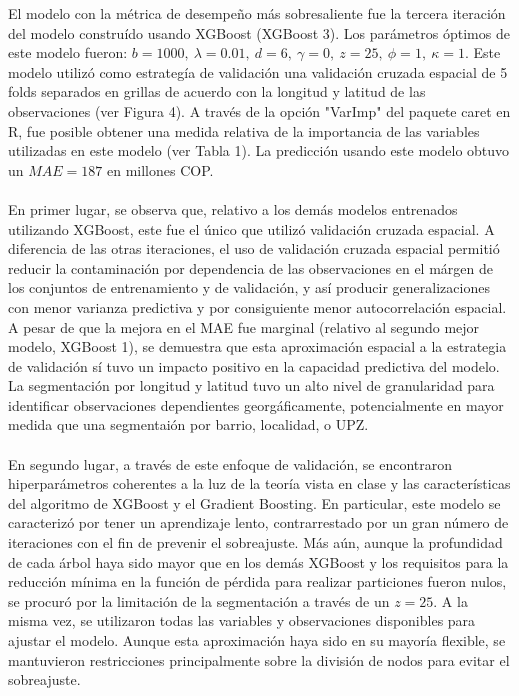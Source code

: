 \documentclass[article,11 pt]{article}
\begin{document}
El modelo con la métrica de desempeño más sobresaliente fue la tercera iteración del modelo construído usando XGBoost (XGBoost 3). Los parámetros óptimos de este modelo fueron: $b = 1000,\ \lambda = 0{.}01,\ d = 6,\ \gamma = 0,\ z = 25,\ \phi = 1,\ \kappa = 1$. Este modelo utilizó como estrategía de validación una validación cruzada espacial de 5 folds separados en grillas de acuerdo con la longitud y latitud de las observaciones (ver Figura 4). A través de la opción "VarImp" del paquete caret en R, fue posible obtener una medida relativa de la importancia de las variables utilizadas en este modelo (ver Tabla 1). La predicción usando este modelo obtuvo un  $MAE= 187 $ en millones COP.
\\
\\
En primer lugar, se observa que, relativo a los demás modelos entrenados utilizando XGBoost, este fue el único que utilizó validación cruzada espacial. A diferencia de las otras iteraciones, el uso de validación cruzada espacial permitió reducir la contaminación por dependencia de las observaciones en el márgen de los conjuntos de entrenamiento y de validación, y así producir generalizaciones con menor varianza predictiva y por consiguiente menor autocorrelación espacial. A pesar de que la mejora en el MAE fue marginal (relativo al segundo mejor modelo, XGBoost 1), se demuestra que esta aproximación espacial a la estrategia de validación sí tuvo un impacto positivo en la capacidad predictiva del modelo. La segmentación por longitud y latitud tuvo un alto nivel de granularidad para identificar observaciones dependientes georgáficamente, potencialmente en mayor medida que una segmentaión por barrio, localidad, o UPZ.
\\
\\
En segundo lugar, a través de este enfoque de validación, se encontraron hiperparámetros coherentes a la luz de la teoría vista en clase y las características del algoritmo de XGBoost y el Gradient Boosting. En particular, este modelo se caracterizó por tener un aprendizaje lento, contrarrestado por un gran número de iteraciones con el fin de prevenir el sobreajuste. Más aún, aunque la profundidad de cada árbol haya sido mayor que en los demás XGBoost y los requisitos para la reducción mínima en la función de pérdida para realizar particiones fueron nulos, se procuró por la limitación de la segmentación a través de un $z=25$. A la misma vez, se utilizaron todas las variables y observaciones disponibles para ajustar el modelo. Aunque esta aproximación haya sido en su mayoría flexible, se mantuvieron restricciones principalmente sobre la división de nodos para evitar el sobreajuste.
\end{document}

